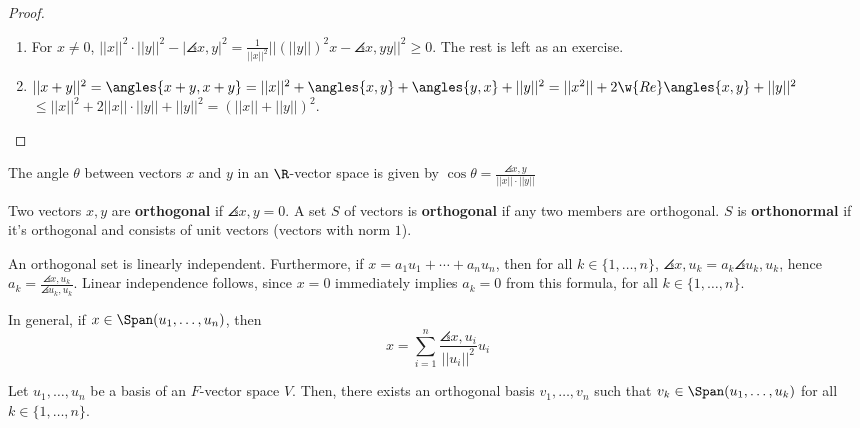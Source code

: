 \begin{proof}
    \hfill
    \begin{enumerate}
        \item[(iii)] For $x \neq 0$, $||x||^2\cdot ||y||^2 - |\angles{x,y}|^2=\frac{1}{||x||^2}|| (||y||)^2x-\angles{x,y}y||^2 \geq 0$. The rest is left as an exercise.
        \item[(iv)] $||x+y||^2 = \angles{x+y,x+y}=||x||^2+\angles{x,y}+\angles{y,x}+||y||^2 = ||x^2||+2\w{Re} \angles{x,y} +||y||^2 $ $\leq ||x||^2+2||x||\cdot ||y|| + ||y||^2=(||x|| + ||y||)^2$.
    \end{enumerate}
\end{proof}

\begin{defn}
    The angle $\theta$ between vectors $x$ and $y$ in an $\R$-vector space is given by $\cos \theta = \frac{\angles{x,y}}{||x||\cdot ||y||}$
\end{defn}

\begin{defn}
    Two vectors $x,y$ are \textbf{orthogonal} if $\angles {x,y}=0$. A set $S$ of vectors is \textbf{orthogonal} if any two members are orthogonal. $S$ is \textbf{orthonormal} if it's orthogonal and consists of unit vectors (vectors with norm $1$).
\end{defn}

\begin{prop}
    An orthogonal set is linearly independent. Furthermore, if $x=a_1u_1+\cdots +a_nu_n$, then for all $k \in \{1,\dots,n\}$, $\angles{x,u_k}=a_k\angles{u_k,u_k}$, hence $a_k=\frac{\angles{x,u_k}}{\angles{u_k,u_k}}$. Linear independence follows, since $x=0$ immediately implies $a_k=0$ from this formula, for all $k \in \{1,\dots,n\}$.

    In general, if $x \in \Span(u_1,\dots,u_n)$, then
    $$x=\sum_{i=1}^n\frac{\angles{x,u_i}}{||u_i||^2}u_i$$
\end{prop}

\begin{thm}
    Let $u_1,\dots,u_n$ be a basis of an $F$-vector space $V$. Then, there exists an orthogonal basis $v_1,\dots,v_n$ such that $v_k\in \Span(u_1,\dots,u_k)$ for all $k \in \{1,\dots,n\}$.
\end{thm}

